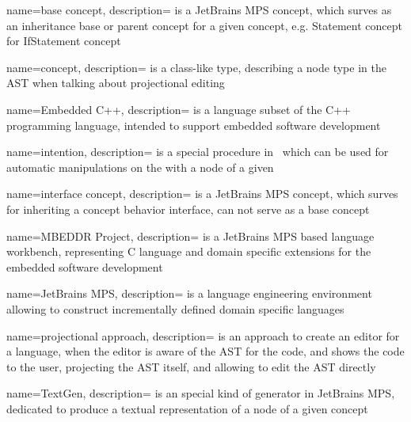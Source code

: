 

{
  name=base concept,
  description={ is a JetBrains MPS concept, which surves as an inheritance base or parent concept for a given concept, e.g. Statement concept for IfStatement concept}
}


{
  name=concept,
  description={ is a class-like type, describing a node type in the AST when talking about projectional editing}
}




{
  name=Embedded C++,
  description={ is a language subset of the C++ programming language, intended to
  support embedded software development}
}


{
  name=intention,
  description={ is a special procedure in \jbmps\ which can be used for automatic manipulations on the  with a node of a given }
}

{
  name=interface concept,
  description={ is a JetBrains MPS concept, which surves for inheriting a concept behavior interface, can not serve as a base concept}
}


{
  name=MBEDDR Project,
  description={ is a JetBrains MPS based language workbench, representing C language and domain specific
  extensions for the embedded software development}
}


{
  name=JetBrains MPS,
  description={ is a language engineering environment 
  allowing to construct incrementally defined domain specific languages}
}

{
  name=projectional approach,
  description={ is an approach to create an editor for a language, when the editor is 
  aware of the AST for the code, and shows the code to the user, projecting the 
  AST itself, and allowing to edit the AST directly}
}

{
  name=TextGen,
  description={ is an special kind of generator in JetBrains MPS, dedicated to produce a textual representation of a node of a given concept}
}
